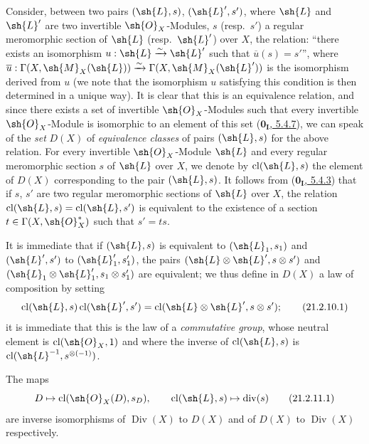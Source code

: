 \begin{env}[21.2.10]
\label{IV.21.2.10}
Consider, between two pairs $(\sh{L},s)$, $(\sh{L}',s')$, where $\sh{L}$ and $\sh{L}'$ are two invertible $\sh{O}_X$-Modules, $s$ (resp.\ $s'$) a regular meromorphic section of $\sh{L}$ (resp.\ $\sh{L}'$) over $X$, the relation:
``there exists an isomorphism $u:\sh{L}\xrightarrow{\sim}\sh{L}'$ such that $\overline{u}(s)=s'$'',
where $\overline{u}:\Gamma(X,\sh{M}_X(\sh{L}))\xrightarrow{\sim}\Gamma(X,\sh{M}_X(\sh{L}'))$ is the isomorphism derived from $u$ (we note that the isomorphism $u$ satisfying this condition is then determined in a unique way).
It is clear that this is an equivalence relation, and since there exists a set of invertible $\sh{O}_X$-Modules such that every invertible $\sh{O}_X$-Module is isomorphic to an element of this set (\hyperref[0.5.4.7]{$\mathbf{0_I}$, 5.4.7}), we can speak of the \emph{set} $D(X)$ of \emph{equivalence classes} of pairs $(\sh{L},s)$ for the above relation.
For every invertible $\sh{O}_X$-Module $\sh{L}$ and every regular meromorphic section
$s$ of $\sh{L}$ over $X$, we denote by $\operatorname{cl}(\sh{L},s)$ the element of $D(X)$ corresponding to the pair $(\sh{L},s)$.
It follows from (\hyperref[0.5.4.3]{$\mathbf{0_I}$, 5.4.3}) that if $s$, $s'$ are two regular meromorphic sections of $\sh{L}$ over $X$, the relation $\operatorname{cl}(\sh{L},s)=\operatorname{cl}(\sh{L},s')$ is equivalent to the existence of a section $t\in\Gamma(X,\sh{O}_X^*)$ such that $s'=ts$.

It is immediate that if $(\sh{L},s)$ is equivalent to $(\sh{L}_1,s_1)$ and $(\sh{L}',s')$ to $(\sh{L}_1',s_1')$, the pairs $(\sh{L}\otimes\sh{L}',s\otimes s')$ and $(\sh{L}_1\otimes\sh{L}_1',s_1\otimes s_1')$ are equivalent;
we thus define in $D(X)$ a law of composition by setting
\[
\label{IV.21.2.10.1}
  \operatorname{cl}(\sh{L},s)\operatorname{cl}(\sh{L}',s')=\operatorname{cl}(\sh{L}\otimes\sh{L}',s\otimes s');
  \tag{21.2.10.1}
\]
it is immediate that this is the law of a \emph{commutative group}, whose neutral element is $\operatorname{cl}(\sh{O}_X,1)$ and where the inverse of $\operatorname{cl}(\sh{L},s)$ is $\operatorname{cl}(\sh{L}^{-1},s^{\otimes(-1)})$.
\end{env}

\begin{proposition}[21.2.11]
\label{IV.21.2.11}
The maps
\[
\label{IV.21.2.11.1}
  D\mapsto\operatorname{cl}(\sh{O}_X(D),s_D),\qquad \operatorname{cl}(\sh{L},s)\mapsto\operatorname{div}(s)
  \tag{21.2.11.1}
\]
are inverse isomorphisms of $\operatorname{Div}(X)$ to $D(X)$ and of $D(X)$ to $\operatorname{Div}(X)$ respectively.
\end{proposition}

